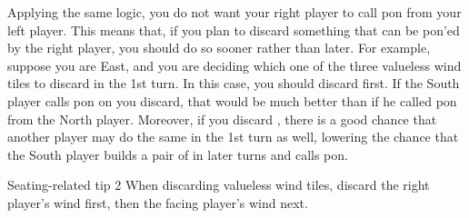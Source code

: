 \bigskip
Applying the same logic, you do not want your right player to call {\jap pon} from your left player. This means that, if you plan to discard something that can be {\jap pon}'ed by the right player, you should do so sooner rather than later. For example, suppose you are East, and you are deciding which one of the three valueless wind tiles {\LARGE\nan\xi\bei} to discard in the 1st turn. In this case, you should discard {\LARGE\nan} first. If the South player calls {\jap pon} on {\LARGE\nan} you discard, that would be much better than if he called {\jap pon} from the North player. Moreover, if you discard {\LARGE\nan}, there is a good chance that another player may do the same in the 1st turn as well, lowering the chance that the South player builds a pair of {\LARGE\nan} in later turns and calls {\jap pon}. 

\begin{itembox}[c]{Seating-related tip 2}
When discarding valueless wind tiles, discard the right player's wind first, then the facing player's wind next.
\end{itembox}



